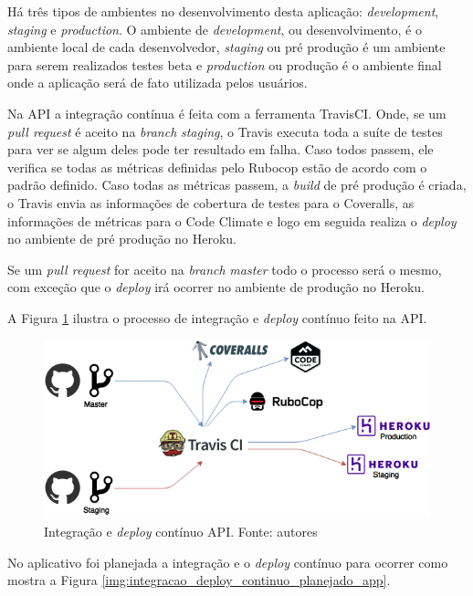 Há três tipos de ambientes no desenvolvimento desta aplicação: \textit{development}, \textit{staging} e \textit{production}. O ambiente de \textit{development}, ou desenvolvimento, é o ambiente local de cada desenvolvedor, \textit{staging} ou pré produção é um ambiente para serem realizados testes beta e \textit{production} ou produção é o ambiente final onde a aplicação será de fato utilizada pelos usuários.

Na API a integração contínua é feita com a ferramenta TravisCI. Onde, se um \textit{pull request} é aceito na \textit{branch} \textit{staging}, o Travis executa toda a suíte de testes para ver se algum deles pode ter resultado em falha. Caso todos passem, ele verifica se todas as métricas definidas pelo Rubocop estão de acordo com o padrão definido. Caso todas as métricas passem, a \textit{build} de pré produção é criada, o Travis envia as informações de cobertura de testes para o Coveralls, as informações de métricas para o Code Climate e logo em seguida realiza o \textit{deploy} no ambiente de pré produção no Heroku.

Se um \textit{pull request} for aceito na \textit{branch} \textit{master} todo o processo será o mesmo, com exceção que o \textit{deploy} irá ocorrer no ambiente de produção no Heroku.

A Figura \ref{img:integracao_deploy_continuo_api} ilustra o processo de integração e \textit{deploy} contínuo feito na API.

\begin{figure}[H]
    \centering
    \includegraphics[scale=0.5]{figuras/api_ci.png}
    \caption[Integração e \textit{deploy} contínuo API]{Integração e \textit{deploy} contínuo API. Fonte: autores}
    \label{img:integracao_deploy_continuo_api}
\end{figure}

No aplicativo foi planejada a integração e o \textit{deploy} contínuo para ocorrer como mostra a Figura \ref{img:integracao_deploy_continuo_planejado_app}.


